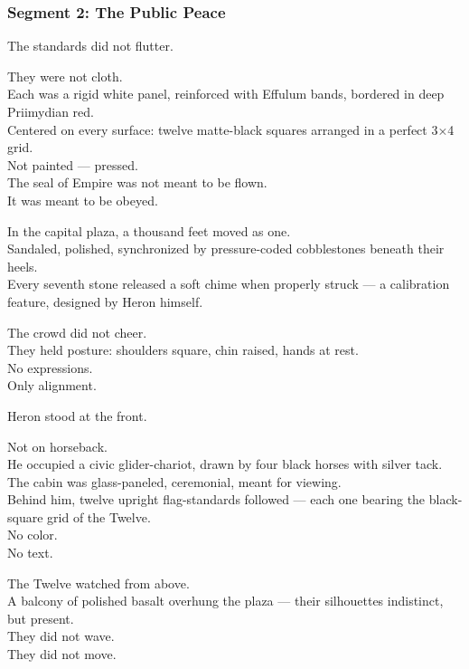 \documentclass[9pt]{article}
\begin{document}
\newpage

\subsubsection*{Segment 2: The Public Peace}

The standards did not flutter.

They were not cloth.\\
Each was a rigid white panel, reinforced with Effulum bands, bordered in deep Priimydian red.\\
Centered on every surface: twelve matte-black squares arranged in a perfect 3×4 grid.\\
Not painted — pressed.\\
The seal of Empire was not meant to be flown.\\
It was meant to be obeyed.

\vspace{1em}

In the capital plaza, a thousand feet moved as one.\\
Sandaled, polished, synchronized by pressure-coded cobblestones beneath their heels.\\
Every seventh stone released a soft chime when properly struck — a calibration feature, designed by Heron himself.

The crowd did not cheer.\\
They held posture: shoulders square, chin raised, hands at rest.\\
No expressions.\\
Only alignment.

Heron stood at the front.

Not on horseback.\\
He occupied a civic glider-chariot, drawn by four black horses with silver tack.\\
The cabin was glass-paneled, ceremonial, meant for viewing.\\
Behind him, twelve upright flag-standards followed — each one bearing the black-square grid of the Twelve.\\
No color.\\
No text.

\vspace{1em}

The Twelve watched from above.\\
A balcony of polished basalt overhung the plaza — their silhouettes indistinct, but present.\\
They did not wave.\\
They did not move.
\end{document}
